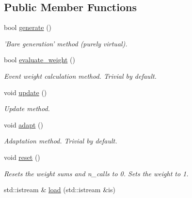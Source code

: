 \subsection*{Public Member Functions}
\begin{DoxyCompactItemize}
\item 
bool \hyperlink{a00395_a23098c7456702cce4946d0d787f5bf37}{generate} ()
\begin{DoxyCompactList}\small\item\em 'Bare generation' method (purely virtual). \end{DoxyCompactList}\item 
\hypertarget{a00395_a1c398ce4d7dd1aed47752d2391ae11df}{bool \hyperlink{a00395_a1c398ce4d7dd1aed47752d2391ae11df}{evaluate\-\_\-weight} ()}\label{a00395_a1c398ce4d7dd1aed47752d2391ae11df}

\begin{DoxyCompactList}\small\item\em Event weight calculation method. Trivial by default. \end{DoxyCompactList}\item 
void \hyperlink{a00395_a40cc397db66b0451b6135c80645e50b9}{update} ()
\begin{DoxyCompactList}\small\item\em Update method. \end{DoxyCompactList}\item 
\hypertarget{a00395_a02d5211d206546de42ec20bbfbf6ecef}{void \hyperlink{a00395_a02d5211d206546de42ec20bbfbf6ecef}{adapt} ()}\label{a00395_a02d5211d206546de42ec20bbfbf6ecef}

\begin{DoxyCompactList}\small\item\em Adaptation method. Trivial by default. \end{DoxyCompactList}\item 
\hypertarget{a00395_acc228746623bfc5c6f3f1d62f3a841e6}{void \hyperlink{a00395_acc228746623bfc5c6f3f1d62f3a841e6}{reset} ()}\label{a00395_acc228746623bfc5c6f3f1d62f3a841e6}

\begin{DoxyCompactList}\small\item\em Resets the weight sums and n\-\_\-calls to 0. Sets the weight to 1. \end{DoxyCompactList}\item 
\hypertarget{a00395_a55efdbc227d118580d2e4d02db4d7cc3}{std\-::istream \& \hyperlink{a00395_a55efdbc227d118580d2e4d02db4d7cc3}{load} (std\-::istream \&is)}\label{a00395_a55efdbc227d118580d2e4d02db4d7cc3}


\end{DoxyCompactItemize}
